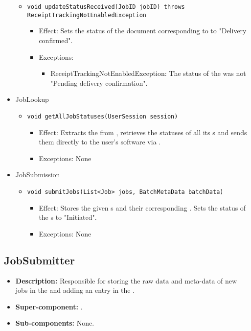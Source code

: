 \begin{itemize}
\begin{itemize}
		\item \texttt{void updateStatusReceived(JobID jobID) throws ReceiptTrackingNotEnabledException}
		\begin{itemize}
            \item Effect: Sets the status of the document corresponding to  to "Delivery confirmed".
            \item Exceptions:
			\begin{itemize}
				\item ReceiptTrackingNotEnabledException: The status of the  was not "Pending delivery confirmation".
			\end{itemize}
        \end{itemize}
    \end{itemize}

    \item JobLookup
    \begin{itemize}
        \item \texttt{void getAllJobStatuses(UserSession session)}
        \begin{itemize}
            \item Effect: Extracts the  from , retrieves the statuses of all its s and sends them directly to the user's software via .
            \item Exceptions: None
        \end{itemize}
    \end{itemize}

	\item JobSubmission 
    \begin{itemize}
        \item \texttt{void submitJobs(List<Job> jobs, BatchMetaData batchData)}
        \begin{itemize}
            \item Effect: Stores the given s and their corresponding . Sets the status of the s to "Initiated".
            \item Exceptions: None
        \end{itemize}
    \end{itemize}
\end{itemize}

\subsection{JobSubmitter}
\begin{itemize}
    \item \textbf{Description:} Responsible for storing the raw data and meta-data of new jobs in the  and adding an entry in the .
    \item \textbf{Super-component:} .
    \item \textbf{Sub-components:} None.
\end{itemize}

